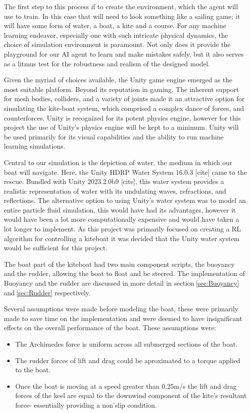 The first step to this process if to create the environment, which the agent will use to train. In this case that will need to look something like a sailing game; it will have some form of water, a boat, a kite and a course. 
For any machine learning endeavor, especially one with such intricate physical dynamics, the choice of simulation environment is paramount. Not only does it provide the playground for our AI agent to learn and make mistakes safely, but it also serves as a litmus test for the robustness and realism of the designed model.

Given the myriad of choices available, the Unity game engine emerged as the most suitable platform. Beyond its reputation in gaming, 
The inherent support for mesh bodies, colliders, and a variety of joints made it an attractive option for simulating the kite-boat system, which comprised a complex dance of forces, and counterforces.
Unity is recognized for its potent physics engine, however for this project the use of Unity's physics engine will be kept to a minimum. Unity will be used primarily for its visual capabilities and the ability to run machine learning simulations. 

Central to our simulation is the depiction of water, the medium in which our boat will navigate. Here, the Unity HDRP Water System 16.0.3 [cite] came to the rescue. Bundled with Unity 2023.2.0b9 [cite], this water system provides a realistic representation of water with its undulating waves, refractions, and reflections. 
The alternative option to using Unity's water system was to model an entire particle fluid simulation, this would have had its advantages, however it would have been a lot more computationally expensive and would have taken a lot longer to implement. As this project was primarily focused on creating a RL algorithm for controlling a kiteboat it was decided that the Unity water system would be sufficient for this project.  

The boat part of the kiteboat had two main component scripts, the buoyancy and the rudder, allowing the boat to float and be steered. The implementation of Buoyancy and the rudder are discussed in more detail in section$~$\ref{sec:Buoyancy} and$~$\ref{sec:Rudder} respectively. 

Several assumptions were made before modeling the boat, these were primarily made to save time on the implementation and were deemed to have insignificant effects on the overall performance of the boat. These assumptions were:
\begin{itemize}
    \item The Archimedes force is uniform across all submerged sections of the boat.
    \item The rudder forces of lift and drag could be aproximated to a torque applied to the boat.
    \item Once the boat is moving at a speed greater than 0.25m/s the lift and drag forces of the keel are equal to the downwind component of the kite's resultant force- essentially providing a non'slip condition.
\end{itemize}
